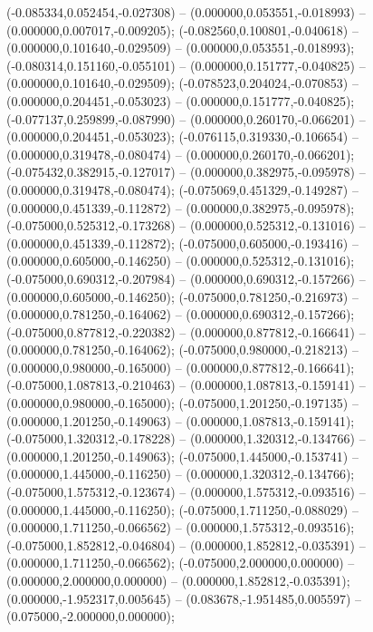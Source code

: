  (-0.085334,0.052454,-0.027308) -- (0.000000,0.053551,-0.018993) -- (0.000000,0.007017,-0.009205);
 (-0.082560,0.100801,-0.040618) -- (0.000000,0.101640,-0.029509) -- (0.000000,0.053551,-0.018993);
 (-0.080314,0.151160,-0.055101) -- (0.000000,0.151777,-0.040825) -- (0.000000,0.101640,-0.029509);
 (-0.078523,0.204024,-0.070853) -- (0.000000,0.204451,-0.053023) -- (0.000000,0.151777,-0.040825);
 (-0.077137,0.259899,-0.087990) -- (0.000000,0.260170,-0.066201) -- (0.000000,0.204451,-0.053023);
 (-0.076115,0.319330,-0.106654) -- (0.000000,0.319478,-0.080474) -- (0.000000,0.260170,-0.066201);
 (-0.075432,0.382915,-0.127017) -- (0.000000,0.382975,-0.095978) -- (0.000000,0.319478,-0.080474);
 (-0.075069,0.451329,-0.149287) -- (0.000000,0.451339,-0.112872) -- (0.000000,0.382975,-0.095978);
 (-0.075000,0.525312,-0.173268) -- (0.000000,0.525312,-0.131016) -- (0.000000,0.451339,-0.112872);
 (-0.075000,0.605000,-0.193416) -- (0.000000,0.605000,-0.146250) -- (0.000000,0.525312,-0.131016);
 (-0.075000,0.690312,-0.207984) -- (0.000000,0.690312,-0.157266) -- (0.000000,0.605000,-0.146250);
 (-0.075000,0.781250,-0.216973) -- (0.000000,0.781250,-0.164062) -- (0.000000,0.690312,-0.157266);
 (-0.075000,0.877812,-0.220382) -- (0.000000,0.877812,-0.166641) -- (0.000000,0.781250,-0.164062);
 (-0.075000,0.980000,-0.218213) -- (0.000000,0.980000,-0.165000) -- (0.000000,0.877812,-0.166641);
 (-0.075000,1.087813,-0.210463) -- (0.000000,1.087813,-0.159141) -- (0.000000,0.980000,-0.165000);
 (-0.075000,1.201250,-0.197135) -- (0.000000,1.201250,-0.149063) -- (0.000000,1.087813,-0.159141);
 (-0.075000,1.320312,-0.178228) -- (0.000000,1.320312,-0.134766) -- (0.000000,1.201250,-0.149063);
 (-0.075000,1.445000,-0.153741) -- (0.000000,1.445000,-0.116250) -- (0.000000,1.320312,-0.134766);
 (-0.075000,1.575312,-0.123674) -- (0.000000,1.575312,-0.093516) -- (0.000000,1.445000,-0.116250);
 (-0.075000,1.711250,-0.088029) -- (0.000000,1.711250,-0.066562) -- (0.000000,1.575312,-0.093516);
 (-0.075000,1.852812,-0.046804) -- (0.000000,1.852812,-0.035391) -- (0.000000,1.711250,-0.066562);
 (-0.075000,2.000000,0.000000) -- (0.000000,2.000000,0.000000) -- (0.000000,1.852812,-0.035391);
 (0.000000,-1.952317,0.005645) -- (0.083678,-1.951485,0.005597) -- (0.075000,-2.000000,0.000000);
